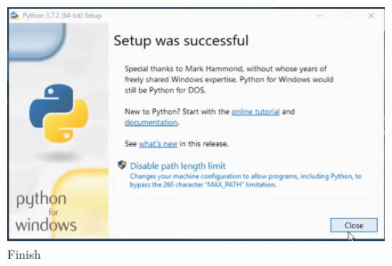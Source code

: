 \documentclass[lipt]{Article}
\begin{document}
\begin{enumerate}
\begin{figure}[!htbp]
\includegraphics{finish.jpg}
\caption{Finish}
\label{finish}
\end{figure}

\end{enumerate}
\end{document}
